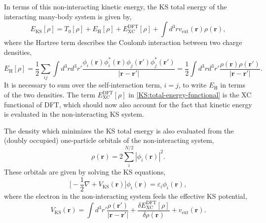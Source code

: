 \documentclass[12pt,a4paper,twoside]{article}
\numberwithin{equation}{section}
\renewcommand{\_}{\textscale{.7}{\textunderscore}}
\begin{document}
In terms of this non-interacting kinetic energy, the KS total energy of the interacting many-body system is given by,
\begin{equation}\label{KS:total-energy-functional}
    E_{\textrm{KS}}[\rho] = T_0[\rho] + E_{\textrm{H}}[\rho] + E_{\textrm{XC}}^{\textrm{DFT}}[\rho] + \int d^3r v_{\textrm{ext}}(\textbf{r}) \rho(\textbf{r}),
\end{equation}
where the Hartree term describes the Coulomb interaction between two charge densities,
\begin{equation}\label{eq:Hartree-energy}
    E_{\textrm{H}}[\rho] = \frac{1}{2} \sum_{ij} \int d^3r d^3r' \frac{\phi_i(\textbf{r})\phi_{i}^*(\textbf{r}) \phi_j(\textbf{r}')\phi_{j}^*(\textbf{r}')}{|\textbf{r}-\textbf{r}'|} =  \frac{1}{2}\int d^3r d^3r' \frac{\rho(\textbf{r}) \rho(\textbf{r}')}{|\textbf{r}-\textbf{r}'|}.
\end{equation}
It is necessary to sum over the self-interaction term, $i=j$, to write $E_{\textrm{H}}$ in terms of the two densities. The term $E_{\textrm{XC}}^{\textrm{DFT}}[\rho]$ in \eqref{KS:total-energy-functional} is the XC functional of DFT, which should now also account for the fact that kinetic energy is evaluated in the non-interacting KS system.

The density which minimizes the KS total energy is also evaluated from the (doubly occupied) one-particle orbitals of the non-interacting system, 
\begin{equation}
    \rho(\textbf{r}) = 2\sum_{i}^{N/2} |\phi_i(\textbf{r})|^2. 
\end{equation}
These orbitals are given by solving the KS equations,
\begin{equation}\label{eq:Kohn-Sham-equations}
    \bigg[-\frac{1}{2}\nabla + V_{\textrm{KS}}(\textbf{r})\bigg] \phi_i(\textbf{r}) = \varepsilon_i\phi_i(\textbf{r}),
\end{equation}
where the electron in the non-interacting system feels the effective KS potential,
\begin{equation}\label{eq:Kohn-sham-potential}
    V_{\textrm{KS}}(\textbf{r}) =  \int d^3r' \frac{\rho(\textbf{r}')}{|\textbf{r}-\textbf{r}'|} + \frac{\delta E_{\textrm{XC}}^{\textrm{DFT}}[\rho]}{\delta\rho(\textbf{r})} + v_{\textrm{ext}}(\textbf{r}).
\end{equation}
\end{document}
